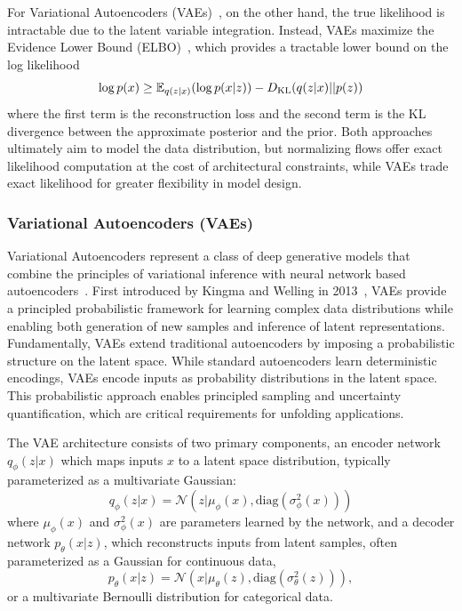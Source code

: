    For Variational Autoencoders (VAEs)~\cite{Kingma2013Auto-EncodingBayes}, on the other hand, the true likelihood is intractable due to the latent variable integration.
    Instead, VAEs maximize the Evidence Lower Bound (ELBO)~\cite{Kingma2019AnAutoencoders}, which provides a tractable lower bound on the log likelihood
    \begin{equation}
        \log p(x) \geq \mathbb{E}_{q(z|x)}\qty(\log p(x|z)) - D_{\text{KL}}(q(z|x) || p(z))
    \end{equation}
    where the first term is the reconstruction loss and the second term is the KL divergence between the approximate posterior and the prior.
    Both approaches ultimately aim to model the data distribution, but normalizing flows offer exact likelihood computation at the cost of architectural constraints, while VAEs trade exact likelihood for greater flexibility in model design.
    \subsubsection{Variational Autoencoders (VAEs)}
        Variational Autoencoders represent a class of deep generative models that combine the principles of variational inference with neural network based autoencoders~\cite{Bank2023Autoencoders}.
        First introduced by Kingma and Welling in 2013~\cite{Kingma2013Auto-EncodingBayes}, VAEs provide a principled probabilistic framework for learning complex data distributions while enabling both generation of new samples and inference of latent representations.
        Fundamentally, VAEs extend traditional autoencoders by imposing a probabilistic structure on the latent space.
        While standard autoencoders learn deterministic encodings, VAEs encode inputs as probability distributions in the latent space.
        This probabilistic approach enables principled sampling and uncertainty quantification, which are critical requirements for unfolding applications.

        The VAE architecture consists of two primary components, an encoder network \(q_{\phi}(z|x)\) which maps inputs \(x\) to a latent space distribution, typically parameterized as a multivariate Gaussian:
        \begin{equation}
        q_{\phi}(z|x) = \mathcal{N}(z|\mu_{\phi}(x), \text{diag}(\sigma^2_{\phi}(x)))
        \end{equation}
        where \(\mu_{\phi}(x)\) and \(\sigma^2_{\phi}(x)\) are parameters learned by the network, and a  decoder network \(p_{\theta}(x|z)\), which reconstructs inputs from latent samples, often parameterized as a Gaussian for continuous data,
        \begin{equation}
            p_{\theta}(x|z) = \mathcal{N}(x|\mu_{\theta}(z), \text{diag}(\sigma^2_{\theta}(z))),
        \end{equation}
        or a multivariate Bernoulli distribution for categorical data.

